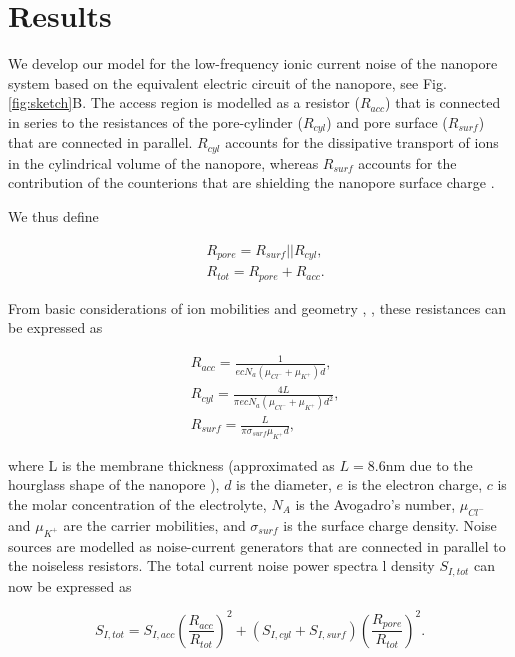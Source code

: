 \section{Results}
We develop our model for the low-frequency ionic current noise of the nanopore system based on the equivalent electric circuit of the nanopore, see Fig.\ref{fig:sketch}B. The access region is modelled as a resistor ($R_{acc}$) that is connected in series to the resistances of the pore-cylinder ($R_{cyl}$) and pore surface ($R_{surf}$) that are connected in parallel. $R_{cyl}$ accounts for the dissipative transport of ions in the cylindrical volume of the nanopore, whereas $R_{surf}$ accounts for the contribution of the counterions that are shielding the nanopore surface charge \cite{Smeets2006}. 


We thus define
  
	\begin{align}
	\label{eqn:Eq2.1}
	& R_{pore}= R_{surf} ||R_{cyl}, \\
	\label{eqn:Eq2.2}                       
	& R_{tot}= R_{pore} + R_{acc}.   
  \end{align}

\noindent From basic considerations of ion mobilities and geometry \cite{Kowalczyk2011b}, \cite{Smeets2006}, these resistances  can be expressed as

     \begin{align}
     \label{eqn:Eq2.3}
     & R_{acc}= \frac{1}{ecN_a(\mu_{Cl^-}+\mu_{K^+})d},\\
     \label{eqn:Eq2.4}
     & R_{cyl}=\frac{4L}{\pi ecN_a(\mu_{Cl^-}+\mu_{K^+})d^2}, \\
     \label{eqn:Eq2.5}
     & R_{surf}= \frac{L}{\pi\sigma_{surf}\mu_{K^+}d},
     \end{align}


\noindent where L is the membrane thickness (approximated as $L = 8.6 $nm due to the hourglass shape of the nanopore \cite{Kim2006}), $d$ is the diameter, $e$ is the electron charge, $c$ is the molar concentration of the electrolyte, $N_A$ is the Avogadro’s number, $\mu_{Cl^-}$ and $\mu_{K^+}$ are the carrier mobilities, and $\sigma_{surf}$ is the surface charge density.
Noise sources are modelled as noise-current generators that are connected in parallel to the noiseless resistors. The total current noise power spectra	l density $S_{I,tot}
$ can now be expressed as


\begin{equation}\label{eqn:Eq2.6}
S_{I,tot}=S_{I,acc}\left(\frac{R_{acc}}{R_{tot}}\right)^2+ (S_{I,cyl}+S_{I,surf})\left(\frac{R_{pore}}{R_{tot}}\right)^2 .
\end{equation}

